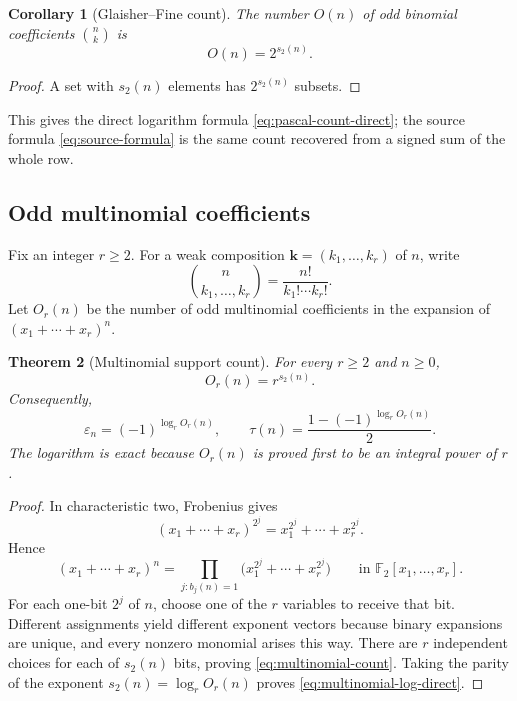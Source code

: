 \documentclass[11pt,oneside]{article}
\newtheorem{theorem}{Theorem}[section]
\newtheorem{corollary}[theorem]{Corollary}
\theoremstyle{definition}
\theoremstyle{remark}
\newcommand{\F}{\mathbb F}
\newcommand{\swt}{s_2}
\newcommand{\eps}{\varepsilon}
\newcommand{\1}{\mathbf 1}
\begin{document}
\begin{corollary}[Glaisher--Fine count]
\label{cor:glaisher-count}
The number \(O(n)\) of odd binomial coefficients \(\binom nk\) is
\begin{equation}
 O(n)=2^{\swt(n)}.
 \label{eq:glaisher-count}
\end{equation}
\end{corollary}

\begin{proof}
A set with \(\swt(n)\) elements has \(2^{\swt(n)}\) subsets.
\end{proof}

This gives the direct logarithm formula \eqref{eq:pascal-count-direct}; the source formula
\eqref{eq:source-formula} is the same count recovered from a signed sum of the whole row.

\subsection{Odd multinomial coefficients}

Fix an integer \(r\ge2\).  For a weak composition
\(\bm k=(k_1,\ldots,k_r)\) of \(n\), write
\[
 \binom{n}{k_1,\ldots,k_r}=\frac{n!}{k_1!\cdots k_r!}.
\]
Let \(O_r(n)\) be the number of odd multinomial coefficients in the expansion of
\((x_1+\cdots+x_r)^n\).

\begin{theorem}[Multinomial support count]
\label{thm:multinomial-count}
For every \(r\ge2\) and \(n\ge0\),
\begin{equation}
 \boxed{O_r(n)=r^{\swt(n)}.}
 \label{eq:multinomial-count}
\end{equation}
Consequently,
\begin{equation}
 \boxed{
 \eps_n=(-1)^{\log_r O_r(n)},
 \qquad
 \tau(n)=\frac{1-(-1)^{\log_rO_r(n)}}2.}
 \label{eq:multinomial-log-direct}
\end{equation}
The logarithm is exact because \(O_r(n)\) is proved first to be an integral power of \(r\).
\end{theorem}

\begin{proof}
In characteristic two, Frobenius gives
\[
 (x_1+\cdots+x_r)^{2^j}=x_1^{2^j}+\cdots+x_r^{2^j}.
\]
Hence
\begin{equation}
 (x_1+\cdots+x_r)^n
 =\prod_{j:b_j(n)=1}
   \bigl(x_1^{2^j}+\cdots+x_r^{2^j}\bigr)
 \qquad\text{in }\F_2[x_1,\ldots,x_r].
 \label{eq:multinomial-frob-factor}
\end{equation}
For each one-bit \(2^j\) of \(n\), choose one of the \(r\) variables to receive that bit.
Different assignments yield different exponent vectors because binary expansions are unique,
and every nonzero monomial arises this way.  There are \(r\) independent choices for each of
\(\swt(n)\) bits, proving \eqref{eq:multinomial-count}.  Taking the parity of the exponent
\(\swt(n)=\log_rO_r(n)\) proves \eqref{eq:multinomial-log-direct}.
\end{proof}
\end{document}
